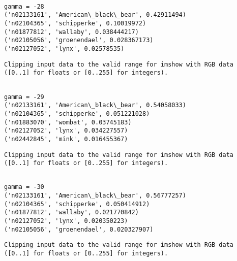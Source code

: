 \documentclass[11pt]{article}
\begin{document}
    \begin{Verbatim}[commandchars=\\\{\}]

gamma = -28
('n02133161', 'American\_black\_bear', 0.42911494)
('n02104365', 'schipperke', 0.10019972)
('n01877812', 'wallaby', 0.038444217)
('n02105056', 'groenendael', 0.028367173)
('n02127052', 'lynx', 0.02578535)

    \end{Verbatim}

    \begin{Verbatim}[commandchars=\\\{\}]
Clipping input data to the valid range for imshow with RGB data ([0..1] for floats or [0..255] for integers).

    \end{Verbatim}

    \begin{Verbatim}[commandchars=\\\{\}]

gamma = -29
('n02133161', 'American\_black\_bear', 0.54058033)
('n02104365', 'schipperke', 0.051221028)
('n01883070', 'wombat', 0.03745183)
('n02127052', 'lynx', 0.034227557)
('n02442845', 'mink', 0.016455367)

    \end{Verbatim}

    \begin{Verbatim}[commandchars=\\\{\}]
Clipping input data to the valid range for imshow with RGB data ([0..1] for floats or [0..255] for integers).

    \end{Verbatim}

    \begin{Verbatim}[commandchars=\\\{\}]

gamma = -30
('n02133161', 'American\_black\_bear', 0.56777257)
('n02104365', 'schipperke', 0.050414912)
('n01877812', 'wallaby', 0.021770842)
('n02127052', 'lynx', 0.020350223)
('n02105056', 'groenendael', 0.020327907)

    \end{Verbatim}

    \begin{Verbatim}[commandchars=\\\{\}]
Clipping input data to the valid range for imshow with RGB data ([0..1] for floats or [0..255] for integers).

    \end{Verbatim}
\end{document}

